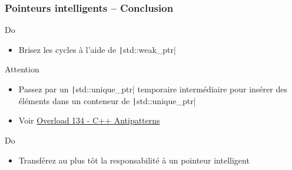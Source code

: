 \documentclass[C++.tex]{subfiles}
\begin{document}
\begin{frame}[fragile]
	\frametitle{Pointeurs intelligents -- Conclusion}
	\begin{exampleblock}{Do}
		\begin{itemize}
			\item Brisez les cycles à l'aide de \texttt|std::weak_ptr|
		\end{itemize}
	\end{exampleblock}

	\begin{alertblock}{Attention}
		\begin{itemize}
			\item Passez par un \texttt|std::unique_ptr| temporaire intermédiaire pour insérer des éléments dans un conteneur de \texttt|std::unique_ptr|
			\item Voir \href{https://accu.org/index.php/journals/2271}{Overload 134 - C++ Antipatterns\linklogo}
		\end{itemize}

	\end{alertblock}

	\begin{exampleblock}{Do}
		\begin{itemize}
			\item Transférez au plus tôt la responsabilité à un pointeur intelligent
		\end{itemize}
	\end{exampleblock}
\end{frame}
\end{document}
